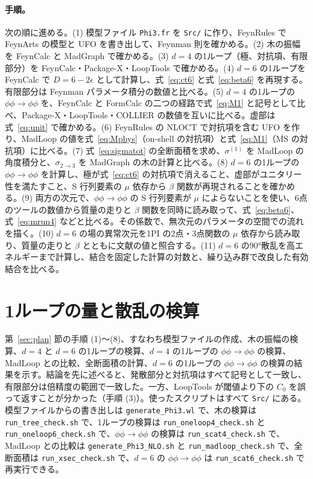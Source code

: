\documentclass[a4paper,10pt]{ltjsarticle}
\begin{document}
\paragraph{手順。}次の順に進める。(1) 模型ファイル \texttt{Phi3.fr} を \texttt{Src/} に作り、FeynRules で FeynArts の模型と UFO を書き出して、Feynman 則を確かめる。(2) 木の振幅を FeynCalc と MadGraph で確かめる。(3) $d=4$ の1ループ（極、対抗項、有限部分）を FeynCalc・Package-X・LoopTools で確かめる。(4) $d=6$ の1ループを FeynCalc で $D=6-2\epsilon$ として計算し、式~\eqref{eq:ct6} と式~\eqref{eq:beta6} を再現する。有限部分は Feynman パラメータ積分の数値と比べる。(5) $d=4$ の1ループの $\phi\phi\to\phi\phi$ を、FeynCalc と FormCalc の二つの経路で式~\eqref{eq:M1} と記号として比べ、Package-X・LoopTools・COLLIER の数値を互いに比べる。虚部は式~\eqref{eq:unit} で確かめる。(6) FeynRules の NLOCT で対抗項を含む UFO を作り、MadLoop の値を式~\eqref{eq:Mphys}（on-shell の対抗項）と式~\eqref{eq:M1}（$\overline{\mathrm{MS}}$ の対抗項）に比べる。(7) 式~\eqref{eq:sigmatot} の全断面積を求め、$\sigma^{(1)}$ を MadLoop の角度積分と、$\sigma_{2\to3}$ を MadGraph の木の計算と比べる。(8) $d=6$ の1ループの $\phi\phi\to\phi\phi$ を計算し、極が式~\eqref{eq:ct6} の対抗項で消えること、虚部がユニタリー性を満たすこと、S 行列要素の $\mu$ 依存から $\beta$ 関数が再現されることを確かめる。(9) 両方の次元で、$\phi\phi\to\phi\phi$ の S 行列要素が $\mu$ によらないことを使い、6点のツールの数値から質量の走りと $\beta$ 関数を同時に読み取って、式~\eqref{eq:beta6}、式~\eqref{eq:mrun4} などと比べる。その係数で、無次元のパラメータの空間での流れを描く。(10) $d=6$ の場の異常次元を1PI の2点・3点関数の $\mu$ 依存から読み取り、質量の走りと $\beta$ とともに文献の値と照合する。(11) $d=6$ の90°散乱を高エネルギーまで計算し、結合を固定した計算の対数と、繰り込み群で改良した有効結合を比べる。

\section{1ループの量と散乱の検算}\label{sec:checks}

第~\ref{sec:plan} 節の手順 (1)〜(8)、すなわち模型ファイルの作成、木の振幅の検算、$d=4$ と $d=6$ の1ループの検算、$d=4$ の1ループの $\phi\phi\to\phi\phi$ の検算、MadLoop との比較、全断面積の計算、$d=6$ の1ループの $\phi\phi\to\phi\phi$ の検算の結果を示す。結論を先に述べると、発散部分と対抗項はすべて記号として一致し、有限部分は倍精度の範囲で一致した。一方、LoopTools が閾値より下の $C_0$ を誤って返すことが分かった（手順 (3)）。使ったスクリプトはすべて \texttt{Src/} にある。模型ファイルからの書き出しは \texttt{generate\_Phi3.wl} で、木の検算は \texttt{run\_tree\_check.sh} で、1ループの検算は \texttt{run\_oneloop4\_check.sh} と \texttt{run\_oneloop6\_check.sh} で、$\phi\phi\to\phi\phi$ の検算は \texttt{run\_scat4\_check.sh} で、MadLoop との比較は \texttt{generate\_Phi3\_NLO.sh} と \texttt{run\_madloop\_check.sh} で、全断面積は \texttt{run\_xsec\_check.sh} で、$d=6$ の $\phi\phi\to\phi\phi$ は \texttt{run\_scat6\_check.sh} で再実行できる。
\end{document}
